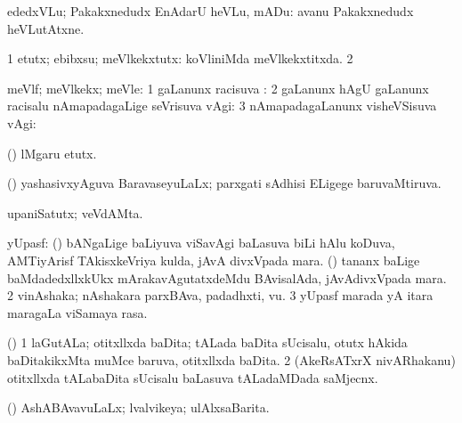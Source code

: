 {{\noindent
\gl{\akirx}
\expl{}
\bmng
ededxVLu; Pakakxnedudx EnAdarU heVLu, mADu:  avanu Pakakxnedudx heVLutAtxne. 
\emng

\noindent
\gl{\pagu}
\expl{}
\bmng
\bnum
\num{1}  etutx; ebibxsu; meVlkekxtutx:  koVliniMda meVlkekxtitxda. 
\num{2}  
\enum
\emng
\eentry

\bentry
{} 
\gl{\pUparx}
\expl{}
\bmng
meVlf; meVlkekx; meVle: 
\bnum
\num{1} \kirxvi gaLanunx racisuva \pUparx:  
\num{2} \kirxvi gaLanunx hAgU \gu gaLanunx racisalu nAmapadagaLige seVrisuva \upa vAgi:  
\num{3} nAmapadagaLanunx visheVSisuva \gu vAgi:  
\enum
\emng
\eentry

\bentry
{} 
\gl{\sakirx}
\expl{}
\bmng
(\nw) lMgaru etutx. 
\emng
\eentry

\bentry
{} 
\gl{\gu}
\expl{}
\bmng
(\AmA) yashasivxyAguva BaravaseyuLaLx; parxgati sAdhisi ELigege baruvaMtiruva. 
\emng
\eentry

\bentry
{} 
\gl{\nA}
\expl{}
\bmng
upaniSatutx; veVdAMta. 
\emng
\eentry

\bentry
{} 
\gl{\nA}
\bmng
\hypertarget{upas(1)}{} 
\bnum
{} yUpasf: 
\banum
{} (\savi) bANgaLige baLiyuva viSavAgi baLasuva biLi hAlu koDuva, AMTiyArisf TAkisxkeVriya kulda, jAvA divxVpada mara. 
 (\pu) tananx baLige baMdadedxllxkUkx mArakavAgutatxdeMdu BAvisalAda, jAvAdivxVpada mara. 
\eanum
\numie
\num{2} vinAshaka; nAshakara parxBAva, padadhxti, \mo vu. 
\num{3} yUpasf marada yA itara maragaLa viSamaya rasa. 
\enum
\emng
\eentry

\bentry
{} 
\gl{\nA}
\expl{}
\bmng
{} 
\emng
\eentry

\bentry
{} 
\gl{\nA}
\expl{}
\bmng
(\saM) 
\bnum
\num{1} laGutALa; otitxllxda baDita; tALada baDita sUcisalu, otutx hAkida baDitakikxMta muMce baruva, otitxllxda baDita. 
\num{2} (AkeRsATxrX nivARhakanu) otitxllxda tALabaDita sUcisalu baLasuva tALadaMDada saMjecnx. 
\enum
\emng
\eentry

\bentry
{} 
\gl{\gu}
\expl{}
\bmng
(\AmA) AshABAvavuLaLx; lvalvikeya; ulAlxsaBarita. 
\emng
\eentry

}}
